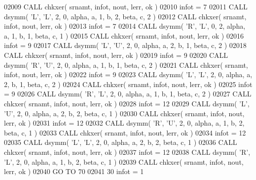 \begin{DoxyCode}
02009       \textcolor{keyword}{CALL }chkxer( srnamt, infot, nout, lerr, ok )
02010       infot = 7
02011       \textcolor{keyword}{CALL }dsymm( \textcolor{stringliteral}{'L'}, \textcolor{stringliteral}{'L'}, 2, 0, alpha, a, 1, b, 2, beta, c, 2 )
02012       \textcolor{keyword}{CALL }chkxer( srnamt, infot, nout, lerr, ok )
02013       infot = 7
02014       \textcolor{keyword}{CALL }dsymm( \textcolor{stringliteral}{'R'}, \textcolor{stringliteral}{'L'}, 0, 2, alpha, a, 1, b, 1, beta, c, 1 )
02015       \textcolor{keyword}{CALL }chkxer( srnamt, infot, nout, lerr, ok )
02016       infot = 9
02017       \textcolor{keyword}{CALL }dsymm( \textcolor{stringliteral}{'L'}, \textcolor{stringliteral}{'U'}, 2, 0, alpha, a, 2, b, 1, beta, c, 2 )
02018       \textcolor{keyword}{CALL }chkxer( srnamt, infot, nout, lerr, ok )
02019       infot = 9
02020       \textcolor{keyword}{CALL }dsymm( \textcolor{stringliteral}{'R'}, \textcolor{stringliteral}{'U'}, 2, 0, alpha, a, 1, b, 1, beta, c, 2 )
02021       \textcolor{keyword}{CALL }chkxer( srnamt, infot, nout, lerr, ok )
02022       infot = 9
02023       \textcolor{keyword}{CALL }dsymm( \textcolor{stringliteral}{'L'}, \textcolor{stringliteral}{'L'}, 2, 0, alpha, a, 2, b, 1, beta, c, 2 )
02024       \textcolor{keyword}{CALL }chkxer( srnamt, infot, nout, lerr, ok )
02025       infot = 9
02026       \textcolor{keyword}{CALL }dsymm( \textcolor{stringliteral}{'R'}, \textcolor{stringliteral}{'L'}, 2, 0, alpha, a, 1, b, 1, beta, c, 2 )
02027       \textcolor{keyword}{CALL }chkxer( srnamt, infot, nout, lerr, ok )
02028       infot = 12
02029       \textcolor{keyword}{CALL }dsymm( \textcolor{stringliteral}{'L'}, \textcolor{stringliteral}{'U'}, 2, 0, alpha, a, 2, b, 2, beta, c, 1 )
02030       \textcolor{keyword}{CALL }chkxer( srnamt, infot, nout, lerr, ok )
02031       infot = 12
02032       \textcolor{keyword}{CALL }dsymm( \textcolor{stringliteral}{'R'}, \textcolor{stringliteral}{'U'}, 2, 0, alpha, a, 1, b, 2, beta, c, 1 )
02033       \textcolor{keyword}{CALL }chkxer( srnamt, infot, nout, lerr, ok )
02034       infot = 12
02035       \textcolor{keyword}{CALL }dsymm( \textcolor{stringliteral}{'L'}, \textcolor{stringliteral}{'L'}, 2, 0, alpha, a, 2, b, 2, beta, c, 1 )
02036       \textcolor{keyword}{CALL }chkxer( srnamt, infot, nout, lerr, ok )
02037       infot = 12
02038       \textcolor{keyword}{CALL }dsymm( \textcolor{stringliteral}{'R'}, \textcolor{stringliteral}{'L'}, 2, 0, alpha, a, 1, b, 2, beta, c, 1 )
02039       \textcolor{keyword}{CALL }chkxer( srnamt, infot, nout, lerr, ok )
02040       \textcolor{keywordflow}{GO TO} 70
02041    30 infot = 1

\end{DoxyCode}
